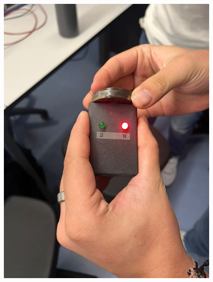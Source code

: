 \begin{figure}[H]
\begin{minipage}{0.3\textwidth}
    \includegraphics[width=\textwidth]{Figures/1. Content/BuscarPolaridad2.jpeg}
    \label{fig: Polaridad Negativa del Iman 2}
  \end{minipage}
  \hfill
  \begin{minipage}{0.3\textwidth}
    \centering

\end{minipage}
\end{figure}
